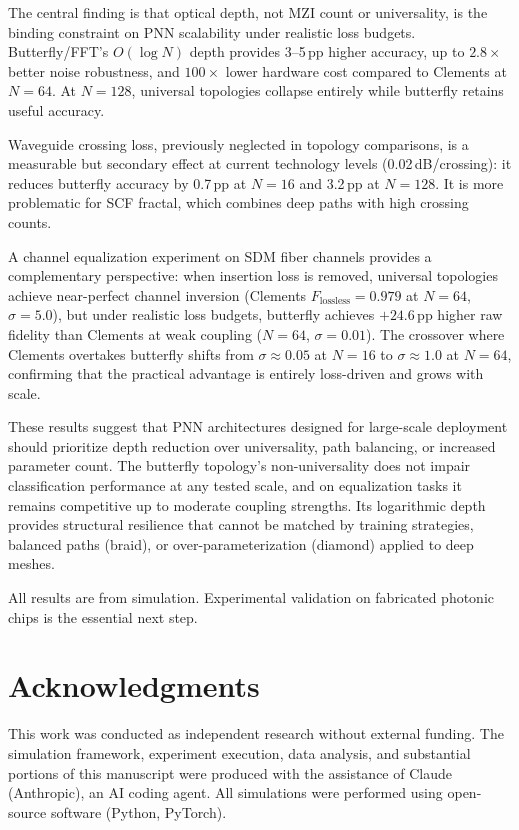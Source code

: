 \documentclass[11pt,a4paper]{article}
\begin{document}
The central finding is that optical depth, not MZI count or universality, is the
binding constraint on PNN scalability under realistic loss budgets.
Butterfly/FFT's $O(\log N)$ depth provides 3--5\,pp higher accuracy, up to $2.8\times$
better noise robustness, and $100\times$ lower hardware cost compared to Clements
at $N{=}64$.  At $N{=}128$, universal topologies collapse entirely while butterfly
retains useful accuracy.

Waveguide crossing loss, previously neglected in topology comparisons, is a
measurable but secondary effect at current technology levels (0.02\,dB/crossing):
it reduces butterfly accuracy by 0.7\,pp at $N{=}16$ and 3.2\,pp at $N{=}128$.
It is more problematic for SCF fractal, which combines deep paths with high
crossing counts.

A channel equalization experiment on SDM fiber channels provides a
complementary perspective: when insertion loss is removed, universal
topologies achieve near-perfect channel inversion (Clements
$F_{\mathrm{lossless}} = 0.979$ at $N{=}64$, $\sigma{=}5.0$), but under
realistic loss budgets, butterfly achieves $+24.6$\,pp higher raw fidelity
than Clements at weak coupling ($N{=}64$, $\sigma{=}0.01$).  The crossover
where Clements overtakes butterfly shifts from $\sigma \approx 0.05$ at
$N{=}16$ to $\sigma \approx 1.0$ at $N{=}64$, confirming that the
practical advantage is entirely loss-driven and grows with scale.

These results suggest that PNN architectures designed for large-scale deployment
should prioritize depth reduction over universality, path balancing, or
increased parameter count.  The butterfly topology's non-universality does not
impair classification performance at any tested scale, and on equalization
tasks it remains competitive up to moderate coupling strengths.  Its logarithmic
depth provides structural resilience that cannot be matched by training
strategies, balanced paths (braid), or over-parameterization (diamond)
applied to deep meshes.

All results are from simulation.  Experimental validation on fabricated photonic
chips is the essential next step.

\section*{Acknowledgments}

This work was conducted as independent research without external funding.
The simulation framework, experiment execution, data analysis, and substantial
portions of this manuscript were produced with the assistance of Claude (Anthropic),
an AI coding agent.  All simulations were performed using open-source software
(Python, PyTorch).
\end{document}
